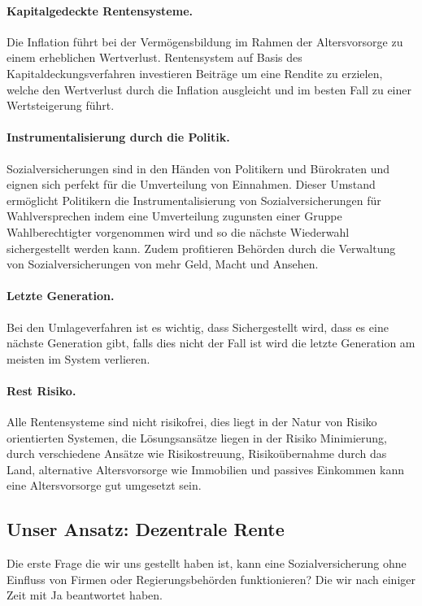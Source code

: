\paragraph{Kapitalgedeckte Rentensysteme.} Die Inflation führt bei der Vermögensbildung im Rahmen der Altersvorsorge zu einem erheblichen Wertverlust. 
Rentensystem auf Basis des Kapitaldeckungsverfahren investieren Beiträge um eine Rendite zu erzielen, welche den Wertverlust durch die Inflation ausgleicht und im besten Fall zu einer Wertsteigerung führt.

\paragraph{Instrumentalisierung durch die Politik.} Sozialversicherungen sind in den Händen von Politikern und Bürokraten und eignen sich perfekt für die Umverteilung von Einnahmen. Dieser Umstand ermöglicht Politikern die Instrumentalisierung von Sozialversicherungen für Wahlversprechen indem eine Umverteilung zugunsten einer Gruppe Wahlberechtigter   vorgenommen wird und so die nächste Wiederwahl sichergestellt werden kann. Zudem profitieren Behörden durch die Verwaltung von Sozialversicherungen von mehr Geld, Macht und Ansehen. \cite{zweifel_insurance_2012}

\paragraph{Letzte Generation.} Bei den Umlageverfahren ist es wichtig, dass Sichergestellt wird, dass es eine nächste Generation gibt, falls dies nicht der Fall ist wird die letzte Generation am meisten im System verlieren.

\paragraph{Rest Risiko.} Alle Rentensysteme sind nicht risikofrei, dies liegt in der Natur von Risiko orientierten Systemen, die Lösungsansätze liegen in der Risiko Minimierung, durch verschiedene Ansätze wie Risikostreuung, Risikoübernahme durch das Land, alternative Altersvorsorge wie Immobilien und passives Einkommen kann eine Altersvorsorge gut umgesetzt sein.


\subsection{Unser Ansatz: Dezentrale Rente}

Die erste Frage die wir uns gestellt haben ist, kann eine Sozialversicherung ohne Einfluss von Firmen oder Regierungsbehörden funktionieren? Die wir nach einiger Zeit mit Ja beantwortet haben.

